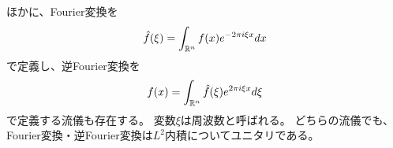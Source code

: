 \begin{rem}
  ほかに、Fourier変換を
  \begin{equation}
    \hat{f}(\xi)=\int_{\mathbb{R}^n}f(x)e^{-2\pi i\xi x}dx
  \end{equation}
  で定義し、逆Fourier変換を
  \begin{equation}
    f(x)=\int_{\mathbb{R}^n}\hat{f}(\xi)e^{2\pi i\xi x}d\xi
  \end{equation}
  で定義する流儀も存在する。
  変数$\xi$は周波数と呼ばれる。
  どちらの流儀でも、Fourier変換・逆Fourier変換は$L^2$内積についてユニタリである。
\end{rem}
